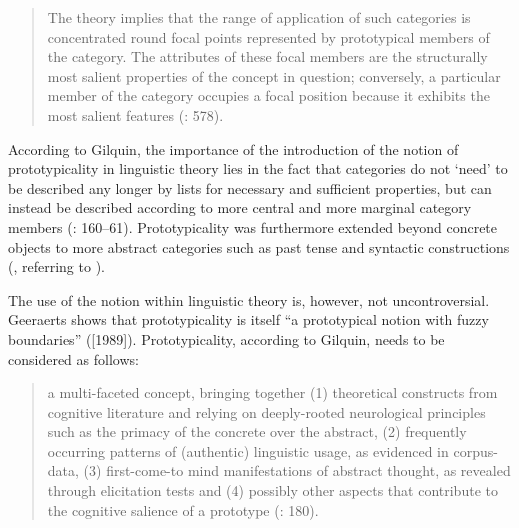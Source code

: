 \begin{quote}
The theory implies that the range of application of such categories is concentrated round focal points represented by prototypical members of the category. The attributes of these focal members are the structurally most salient properties of the concept in question; conversely, a particular member of the category occupies a focal position because it exhibits the most salient features (\citealt{allan_lexical_2013}: 578).
\end{quote}


According to Gilquin, the importance of the introduction of the notion of prototypicality in linguistic theory lies in the fact that categories do not ‘need’ to be described any longer by lists for necessary and sufficient properties, but can instead be described according to more central and more marginal category members (\citealt{gilquin_place_2006}: 160–61). Prototypicality was furthermore extended beyond concrete objects to more abstract categories such as past tense and syntactic constructions (\citealt{gilquin_place_2006}, referring to \citealt{taylor_linguistic_1989}).



The use of the notion within linguistic theory is, however, not uncontroversial. Geeraerts shows that prototypicality is itself “a prototypical notion with fuzzy boundaries” (\citealt{Geeraerts2006}[1989]). Prototypicality, according to Gilquin, needs to be considered as follows:


\begin{quote}
a multi-faceted concept, bringing together (1) theoretical constructs from cognitive literature and relying on deeply-rooted neurological principles such as the primacy of the concrete over the abstract, (2) frequently occurring patterns of (authentic) linguistic usage, as evidenced in corpus-data, (3) first-come-to mind manifestations of abstract thought, as revealed through elicitation tests and (4) possibly other aspects that contribute to the cognitive salience of a prototype (\citealt{gilquin_place_2006}: 180).
\end{quote}


